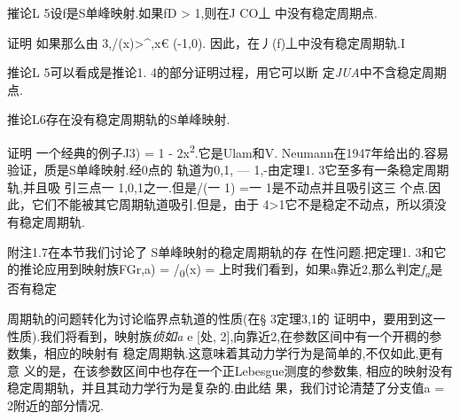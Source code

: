 摧论L 5设f是S单峰映射.如果fD \textgreater{} 1,则在J CO丄
中没有稳定周期点.

证明 如果那么由 3,/(x)\textgreater{}\^{},x€ (-1,0).
因此，在丿(f)丄中没有稳定周期轨.I

推论L 5可以看成是推论1. 4的部分证明过程，用它可以断
定\emph{JUA}中不含稳定周期点.

推论L6存在没有稳定周期轨的S单峰映射.

证明 一个经典的例子J3) = 1 - 2x\textsuperscript{2}.它是Ulam和V.
Neumann在1947年给出的.容易验证，质是S单峰映射.经0点的 轨道为0,1, ---
1,-由定理1. 3它至多有一条稳定周期轨,并且吸 引三点一 1,0,1之一.但是/(一
1) =一 1是不动点并且吸引这三
个点.因此，它们不能被其它周期轨道吸引.但是，由于
4\textgreater{}1它不是稳定不动点，所以須没有稳定周期轨.\textbar{}

附注1.7在本节我们讨论了 S单峰映射的稳定周期轨的存 在性问题.把定理1.
3和它的推论应用到映射族FGr,a) = /\textsubscript{0}(x) =
上时我们看到，如果a靠近2,那么判定\emph{f\textsubscript{a}}是否有稳定

周期轨的问题转化为讨论临界点轨道的性质(在§ 3定理3,1的
证明中，要用到这一性质).我们将看到，映射族\emph{侦如a} e {[}处,
2{]},向靠近2,在参数区间中有一个开稠的参数集，相应的映射有
稳定周期執.这意味着其动力学行为是简单的,不仅如此,更有意
义的是，在该参数区间中也存在一个正Lebesgue测度的参数集,
相应的映射没有稳定周期轨，并且其动力学行为是复杂的.由此结
果，我们讨论清楚了分支值a = 2附近的部分情况.